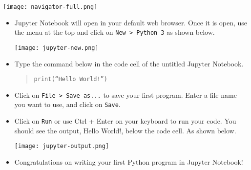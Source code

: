 \documentclass[12pt]{article}
\begin{document}
\begin{center}
\texttt{[image: navigator-full.png]}
\end{center}  

\begin{itemize}
  \item Jupyter Notebook will open in your default web browser.  Once it is open, use the menu at the top and click on {\tt New > Python 3} as shown below.
  \begin{center}
\texttt{[image: jupyter-new.png]}
\end{center}  
  
  \item Type the command below in the code cell of the untitled Jupyter Notebook.
      \begin{quote}
      \small\tt print(``Hello World!'')
    \end{quote}
  \item Click on {\tt File > Save as...} to save your first program.  Enter a file name you want to use, and click on {\tt Save}.
  \item Click on {\tt Run} or use Ctrl + Enter on your keyboard to run your code.  You should see the output, Hello World!, below the code cell.  As shown below. \begin{center}
\texttt{[image: jupyter-output.png]}
\end{center}  
  
  \item Congratulations on writing your first Python program in Jupyter Notebook!
\end{itemize}
\end{document}
